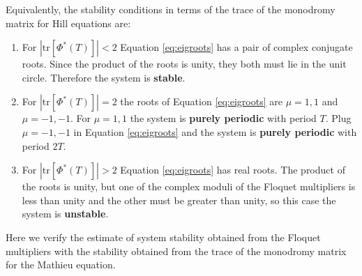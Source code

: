 \documentclass{article}
\begin{document}
Equivalently, the stability conditions in terms of the 
trace of the monodromy matrix for Hill equations are:
\begin{enumerate}[label=(\alph*)]
\item For $|\text{tr}[\Phi^*(T)]|<2$ Equation \ref{eq:eigroots} has a pair of complex conjugate 
roots. Since the product 
of the roots is unity, they both must lie in the unit circle. 
Therefore the system is \textbf{stable}.
\item For $|\text{tr}[\Phi^*(T)]|=2$ the roots of Equation \ref{eq:eigroots} are $\mu=1,1$ and
$\mu=-1,-1$. For $\mu=1,1$ the system is \textbf{purely periodic} 
with period $T$. Plug $\mu=-1,-1$ in Equation \ref{eq:eigroots} and the system is \textbf{purely periodic} 
with period $2T$.
\item For $|\text{tr}[\Phi^*(T)]|>2$ Equation \ref{eq:eigroots} has real roots. The product 
of the roots is unity, but one of the complex moduli of the Floquet multipliers is 
less than unity and the other must be greater
than unity, so this case the system is \textbf{unstable}.
\end{enumerate}
Here we verify the estimate of system stability obtained from the Floquet multipliers 
with the stability obtained from the trace of the monodromy matrix for the Mathieu equation.


\newpage
\end{document}
